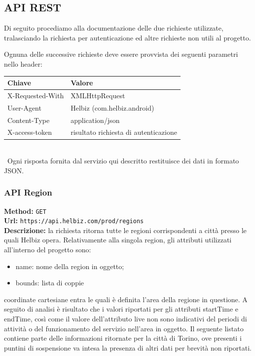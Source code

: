 \subsection{API REST}

Di seguito procediamo alla documentazione delle due richieste utilizzate,
tralasciando la richiesta per autenticazione ed altre richieste non
utili al progetto.

Ognuna delle successive richieste deve essere provvista dei seguenti
parametri nello header: \\

\begin{tabular}{ll}
\toprule
\textbf{Chiave} & \textbf{Valore} \\
\midrule
X-Requested-With & XMLHttpRequest \\
User-Agent & Helbiz (com.helbiz.android) \\
Content-Type & application/json \\
X-access-token & risultato richiesta di autenticazione \\
\bottomrule
\end{tabular} \\

\noindent~Ogni risposta fornita dal servizio qui descritto restituisce dei
dati in formato JSON.

\subsubsection{API Region}

\textbf{Method:} \texttt{GET} \\
\textbf{Url:} \texttt{https://api.helbiz.com/prod/regions} \\

\noindent\textbf{Descrizione:} la richiesta ritorna tutte le regioni corrispondenti
a città presso le quali Helbiz opera.
Relativamente alla singola region, gli attributi utilizzati all'interno del
progetto sono:
\begin{itemize}
\item name: nome della region in oggetto;
\item bounds: lista di coppie
\end{itemize}
coordinate cartesiane entra le quali è definita l'area della regione in
questione.
A seguito di analisi è risultato che i valori riportati per gli attributi
startTime e endTime, così come il valore dell'attributo live non sono
indicativi del periodi di attività o del funzionamento del servizio
nell'area in oggetto.
Il seguente listato contiene parte delle informazioni ritornate per
la città di Torino, ove presenti i puntini di sospensione va intesa
la presenza di altri dati per brevità non riportati.

